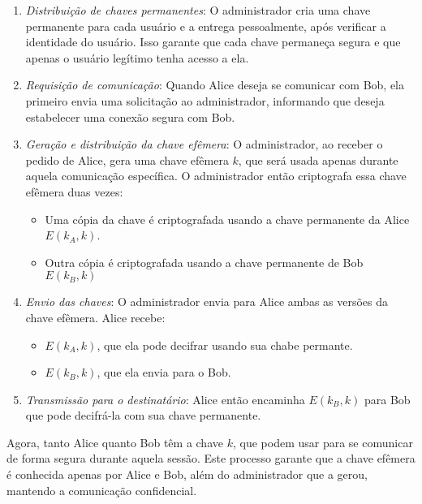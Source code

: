 \begin{enumerate}
\item {\em Distribuição de chaves permanentes}:
  O administrador cria uma chave permanente para cada usuário e a entrega pessoalmente, após verificar a identidade do usuário.
  Isso garante que cada chave permaneça segura e que apenas o usuário legítimo tenha acesso a ela.
  
\item {\em Requisição de comunicação}:
  Quando Alice deseja se comunicar com Bob, ela primeiro envia uma solicitação ao administrador, informando que deseja estabelecer uma conexão segura com Bob.

\item {\em Geração e distribuição da chave efêmera}:
  O administrador, ao receber o pedido de Alice, gera uma chave efêmera $k$, que será usada apenas durante aquela comunicação específica.
  O administrador então criptografa essa chave efêmera duas vezes:
  \begin{itemize}
  \item Uma cópia da chave é criptografada usando a chave permanente da Alice $E(k_A,k)$.
  \item Outra cópia é criptografada usando a chave permanente de Bob $E(k_B,k)$
  \end{itemize}
\item {\em Envio das chaves}:
  O administrador envia para Alice ambas as versões da chave efêmera.
  Alice recebe:
  \begin{itemize}
  \item $E(k_A,k)$, que ela pode decifrar usando sua chabe permante.
  \item $E(k_B,k)$, que ela envia para o Bob.
  \end{itemize}
\item {\em Transmissão para o destinatário}:
  Alice então encaminha $E(k_B,k)$ para Bob que pode decifrá-la com sua chave permanente.
\end{enumerate}

Agora, tanto Alice quanto Bob têm a chave $k$, que podem usar para se comunicar de forma segura durante aquela sessão.
Este processo garante que a chave efêmera é conhecida apenas por Alice e Bob, além do administrador que a gerou, mantendo a comunicação confidencial.

\begin{center}
\end{center}

